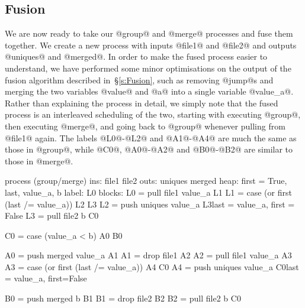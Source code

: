 

\subsection{Fusion}


We are now ready to take our @group@ and @merge@ processes and fuse them together. 
We create a new process with inputs @file1@ and @file2@ and outputs @uniques@ and @merged@.
In order to make the fused process easier to understand, we have performed some minor optimisations on the output of the fusion algorithm described in~\S\ref{s:Fusion}, such as removing @jump@s and merging the two variables @value@ and @a@ into a single variable @value_a@.
Rather than explaining the process in detail, we simply note that the fused process is an interleaved scheduling of the two, starting with executing @group@, then executing @merge@, and going back to @group@ whenever pulling from @file1@ again.
The labels @L0@-@L2@ and @A1@-@A4@ are much the same as those in @group@, while @C0@, @A0@-@A2@ and @B0@-@B2@ are similar to those in @merge@.

\begin{code}
process (group/merge)
     ins: file1 file2
    outs: uniques merged
    heap: {first = True, last, value_a, b}
   label: L0
  blocks: L0 = pull file1   value_a               L1
          L1 = case (or first (last /= value_a))  L2    L3
          L2 = push uniques value_a               L3{last = value_a, first = False}
          L3 = pull file2 b                       C0

          C0 = case (value_a < b)                 A0    B0

          A0 = push merged  value_a               A1
          A1 = drop file1                         A2
          A2 = pull file1   value_a               A3
          A3 = case (or first (last /= value_a))  A4    C0
          A4 = push uniques value_a               C0{last = value_a, first=False}

          B0 = push merged b                      B1
          B1 = drop file2                         B2
          B2 = pull file2  b                      C0
\end{code}


